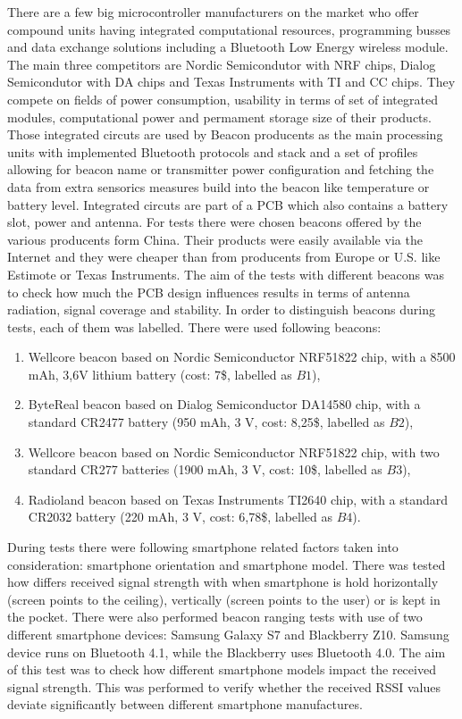 \documentclass[../main.tex]{subfiles}
\begin{document}
There are a few big microcontroller manufacturers on the market who offer compound units having integrated computational resources, programming busses and data exchange solutions including a Bluetooth Low Energy wireless module\cite{beacons_ble_evaluation}. The main three competitors are Nordic Semicondutor with NRF chips, Dialog Semicondutor with DA chips and Texas Instruments with TI and CC chips. They compete on fields of power consumption, usability in terms of set of integrated modules, computational power and permament storage size of their products. Those integrated circuts are used by Beacon producents as the main processing units with implemented Bluetooth protocols and stack and a set of profiles allowing for beacon name or transmitter power configuration and fetching the data from extra sensorics measures build into the beacon like temperature or battery level. Integrated circuts are part of a PCB which also contains a battery slot, power and antenna. For tests there were chosen beacons offered by the various producents form China. Their products were easily available via the Internet and they were cheaper than from producents from Europe or U.S. like Estimote or Texas Instruments\cite{beacons_ble_evaluation}. The aim of the tests with different beacons was to check how much the PCB design influences results in terms of antenna radiation, signal coverage and stability. In order to distinguish beacons during tests, each of them was labelled. There were used following beacons:
\begin{enumerate}
	\item Wellcore beacon based on Nordic Semiconductor NRF51822 chip, with a 8500 mAh, 3,6V lithium battery (cost: 7\$, labelled as $B1$),
	\item ByteReal beacon based on Dialog Semiconductor DA14580 chip, with a standard CR2477 battery (950 mAh, 3 V, cost: 8,25\$, labelled as $B2$),
	\item Wellcore beacon based on Nordic Semiconductor NRF51822 chip, with two standard CR277 batteries (1900 mAh, 3 V, cost: 10\$, labelled as $B3$),
	\item Radioland beacon based on Texas Instruments TI2640 chip, with a standard CR2032 battery (220 mAh, 3 V, cost: 6,78\$, labelled as $B4$).
\end{enumerate}

During tests there were following smartphone related factors taken into consideration: smartphone orientation and smartphone model. There was tested how differs received signal strength with when smartphone is hold horizontally (screen points to the ceiling), vertically (screen points to the user) or is kept in the pocket. There were also performed beacon ranging tests with use of two different smartphone devices: Samsung Galaxy S7 and Blackberry Z10. Samsung device runs on Bluetooth 4.1, while the Blackberry uses Bluetooth 4.0. The aim of this test was to check how different smartphone models impact the received signal strength. This was performed to verify whether the received RSSI values deviate significantly between different smartphone manufactures.
\end{document}
